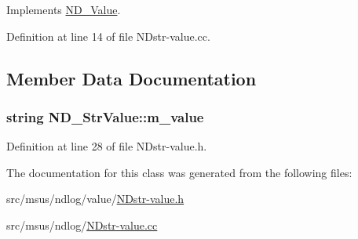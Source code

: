Implements \hyperlink{class_n_d___value_a7660a0e6c07a198410fc05725d903219}{N\-D\-\_\-\-Value}.



Definition at line 14 of file N\-Dstr-\/value.\-cc.



\subsection{Member Data Documentation}
\hypertarget{class_n_d___str_value_a7ea3afd2060a79427418d94ffceae984}{
\subsubsection[{m\-\_\-value}]{\setlength{\rightskip}{0pt plus 5cm}string N\-D\-\_\-\-Str\-Value\-::m\-\_\-value\hspace{0.3cm}{\ttfamily [protected]}}}\label{class_n_d___str_value_a7ea3afd2060a79427418d94ffceae984}


Definition at line 28 of file N\-Dstr-\/value.\-h.



The documentation for this class was generated from the following files\-:\begin{DoxyCompactItemize}
\item 
src/msus/ndlog/value/\hyperlink{_n_dstr-value_8h}{N\-Dstr-\/value.\-h}\item 
src/msus/ndlog/\hyperlink{_n_dstr-value_8cc}{N\-Dstr-\/value.\-cc}\end{DoxyCompactItemize}
